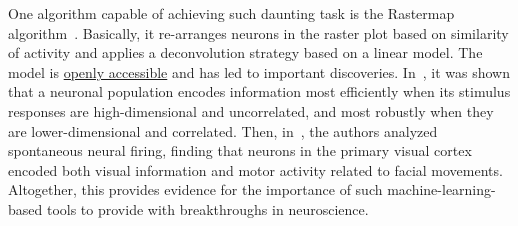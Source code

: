 \documentclass[brainsci, %
               review,submit,pdftex,moreauthors%
               ]{Definitions/mdpi}
\begin{document}
One algorithm capable of achieving such daunting task is the Rastermap algorithm~\citep{pachitariu_robustness_2018}. Basically, it re-arranges neurons in the raster plot based on similarity of activity and applies a deconvolution strategy based on a linear model. The model is \href{https://github.com/MouseLand/rastermap}{openly accessible} and has led to important discoveries. In~\citet{stringer_high-dimensional_2019}, it was shown that a neuronal population encodes information most efficiently when its stimulus responses are high-dimensional and uncorrelated, and most robustly when they are lower-dimensional and correlated. 
Then, in~\citep{stringer_high-precision_2021}, the authors analyzed spontaneous neural firing, finding that neurons in the primary visual cortex encoded both visual information and motor activity related to facial movements. Altogether, this provides evidence for the importance of such machine-learning-based tools to provide with breakthroughs in neuroscience.

\end{document}
